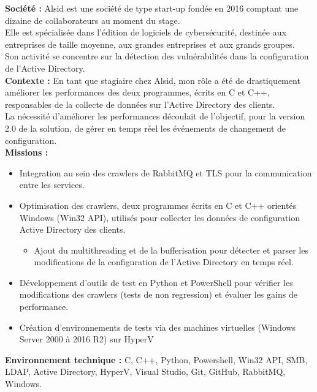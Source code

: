 \documentclass[8pt]{developercv} %
\begin{document}
\textbf{Société :} Alsid est une société de type start-up fondée en 2016 comptant une dizaine de collaborateurs au moment du stage.\\
Elle est spécialisée dans l'édition de logiciels de cybersécurité, destinée aux entreprises de taille moyenne, aux grandes entreprises et aux grands groupes.\\
Son activité se concentre sur la détection des vulnérabilités dans la configuration de l'Active Directory.\\

\textbf{Contexte :} En tant que stagiaire chez Alsid, mon rôle a été de drastiquement améliorer les performances des deux programmes, écrits en C et C++, responsables de la collecte de données sur l'Active Directory des clients.\\

La nécessité d'améliorer les performances découlait de l'objectif, pour la version 2.0 de la solution, de gérer en temps réel les événements de changement de configuration.\\

\textbf{Missions :}
\begin{itemize}
    \item Integration au sein des crawlers de RabbitMQ et TLS pour la communication entre les services.
    \item Optimisation des crawlers, deux programmes écrits en C et C++ orientés Windows (Win32 API), utilisés pour collecter les données de configuration Active Directory des clients.
        \begin{itemize}
            \item Ajout du multithreading et de la bufferisation pour détecter et parser les modifications de la configuration de l'Active Directory en temps réel.
        \end{itemize}
    \item Développement d'outils de test en Python et PowerShell pour vérifier les modifications des crawlers (tests de non regression) et évaluer les gains de performance.
    \item Création d'environnements de tests via des machines virtuelles (Windows Server 2000 à 2016 R2) sur HyperV
\end{itemize}
\vspace{\baselineskip}
\textbf{Environnement technique :} C, C++, Python, Powershell, Win32 API, SMB, LDAP, Active Directory, HyperV, Visual Studio, Git, GitHub, RabbitMQ, Windows.\\
\end{document}
